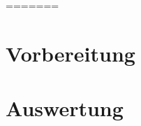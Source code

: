 \documentclass{include/protokollclass}
\begin{document}
    \FrontMatter


    \begingroup \let\clearpage\relax    %
    \tableofcontents                    %
    \listoffigures
    \listoftables
    \endgroup



    \MainMatter
    
            
%    
%
%    
%
%	 

    

=======
    \chapter{Vorbereitung}


	\chapter{Auswertung}
	
    \Appendix

	\begingroup
	\let\clearpage\relax

    \TheBibliography

    
    

    \endgroup
\end{document}
